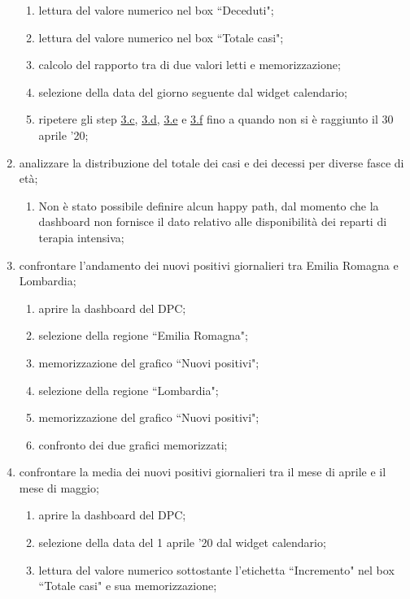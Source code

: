 \begin{enumerate}
\begin{enumerate}[label=\alph*.]
        \item lettura del valore numerico nel box ``Deceduti"; \label{taa:c}
        \item lettura del valore numerico nel box ``Totale casi"; \label{taa:d}
        \item calcolo del rapporto tra di due valori letti e memorizzazione; \label{taa:e}
        \item selezione della data del giorno seguente dal widget calendario; \label{taa:f}
        \item ripetere gli step \hyperref[taa:c]{3.c}, \hyperref[taa:d]{3.d}, \hyperref[taa:e]{3.e} e \hyperref[taa:f]{3.f} fino a quando non si è raggiunto il 30 aprile '20;
    \end{enumerate}
    \item analizzare la distribuzione del totale dei casi e dei decessi per diverse fasce di età;
    \begin{enumerate}[label=\alph*.]
        \item  Non è stato possibile definire alcun happy path, dal momento che la dashboard non fornisce il dato relativo alle disponibilità dei reparti di terapia intensiva;
    \end{enumerate}
    \item confrontare l'andamento dei nuovi positivi giornalieri tra Emilia Romagna e Lombardia;
    \begin{enumerate}[label=\alph*.]
        \item aprire la dashboard del DPC;
        \item selezione della regione ``Emilia Romagna";
        \item memorizzazione del grafico ``Nuovi positivi";
        \item selezione della regione ``Lombardia";
        \item memorizzazione del grafico ``Nuovi positivi";
        \item confronto dei due grafici memorizzati;
    \end{enumerate}
    \item confrontare la media dei nuovi positivi giornalieri tra il mese di aprile e il mese di maggio;
    \begin{enumerate}[label=\alph*.]
        \item aprire la dashboard del DPC;
        \item selezione della data del 1 aprile '20 dal widget calendario; \label{at:b}
        \item lettura del valore numerico sottostante l'etichetta ``Incremento" nel box ``Totale casi" e sua memorizzazione; \label{at:c}

\end{enumerate}
\end{enumerate}
